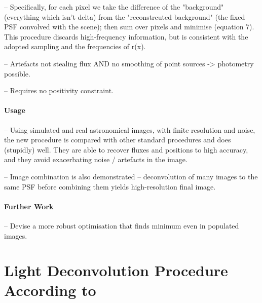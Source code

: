 \documentclass[letterpaper, 11pt]{article}
\begin{document}
-- Specifically, for each pixel we take the difference of the "background" (everything which isn't delta) from the "reconstrcuted background" 
(the fixed PSF convolved with the scene); then sum over pixels and minimise (equation 7). This procedure discards high-frequency information, 
but is consistent with the adopted sampling and the frequencies of r(x).

-- Artefacts not stealing flux AND no smoothing of point sources -> 
photometry possible.

-- Requires no positivity constraint.


\paragraph{Usage}

-- Using simulated and real astronomical images, with finite resolution and noise, the new procedure is compared with other standard 
procedures and does (stupidly) well. They are able to recover fluxes and positions to high accuracy, and they avoid exacerbating noise / 
artefacts in the image.

-- Image combination is also demonstrated -- deconvolution of many images to the same PSF before combining them yields 
high-resolution final image.


\paragraph{Further Work}

-- Devise a more robust optimisation that finds minimum even in populated images.



\section{Light Deconvolution Procedure According to \citet{MCS98}}
\label{sec:MCS98procedure}
\end{document}
